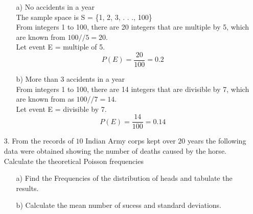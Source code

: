 \documentclass[a4paper,11pt,openright]{report}
\begin{document}
\begin{enumerate}
\begin{enumerate}

\item[a)] No accidents in a year \\
The sample space is S = \{1, 2, 3, . . ., 100\} \\
From integers 1 to 100, there are 20 integers that are multiple by 5, which are known from
$100//5 = 20$. \\
Let event E = multiple of 5. 
\begin{equation*}
P(E) = \frac{20}{100} = 0.2
\end{equation*}

\item[b)] More than $3$ accidents in a year \\
From integers 1 to 100, there are 14 integers that are divisible by 7, which are known from
as $100//7 = 14$. \\
Let event E = divisible by 7.
\begin{equation*}
P(E) = \frac{14}{100} = 0.14
\end{equation*}

\end{enumerate}

\item[3.] From the records of $10$ Indian Army corps kept over $20$ years the following data
were obtained showing the number of deaths caused by the horse. Calculate the theoretical
Poisson frequencies \\

\begin{enumerate}

\item[a)] Find the Frequencies of the distribution of heads and tabulate the results.
\item[b)] Calculate the mean number of sucess and standard deviations.

\end{enumerate}

\end{enumerate}
\end{document}
